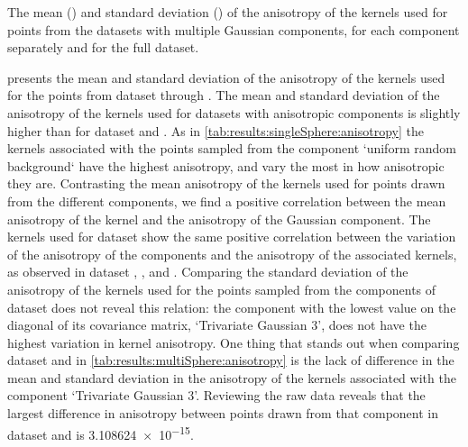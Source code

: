 	\begin{table*}
		\centering
		
		\caption{The mean (\mean) and standard deviation (\SD) of the anisotropy of the kernels used for points from the datasets with multiple Gaussian components, for each component separately and for the full dataset.} 	
		\label{tab:results:multiSphere:anisotropy}
	\end{table*}
	 presents the mean and standard deviation of the anisotropy of the kernels used for the points from dataset \ferdosiTwo through \baakmanThree.
	The mean and standard deviation of the anisotropy of the kernels used for datasets with anisotropic components is slightly higher than for dataset \ferdosiTwo and \ferdosiThree.
	As in \cref{tab:results:singleSphere:anisotropy} the kernels associated with the points sampled from the component `uniform random background` have the highest anisotropy, and vary the most in how anisotropic they are. 
	Contrasting the mean anisotropy of the kernels used for points drawn from the different components, we find a positive correlation between the mean anisotropy of the kernel and the anisotropy of the Gaussian component. 
		The kernels used for dataset \baakmanTwo show the same positive correlation between the variation of the anisotropy of the components and the anisotropy of the associated kernels, as observed in dataset \baakmanOne, \baakmanFour, and \baakmanFive. 
		Comparing the standard deviation of the anisotropy of the kernels used for the points sampled from the components of dataset \baakmanThree does not reveal this relation: the component with the lowest value on the diagonal of its covariance matrix, `Trivariate Gaussian 3', does not have the highest variation in kernel anisotropy. 
	One thing that stands out when comparing dataset \ferdosiThree and \baakmanThree in \cref{tab:results:multiSphere:anisotropy} is the lack of difference in the mean and standard deviation in the anisotropy of the kernels associated with the component `Trivariate Gaussian 3'. Reviewing the raw data reveals that the largest difference in anisotropy between points drawn from that component in dataset \ferdosiThree and \baakmanThree is \num{3.108624e-15}.

